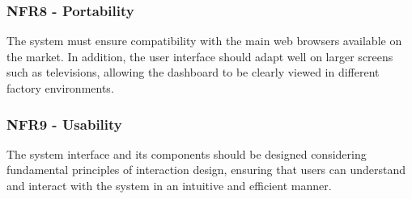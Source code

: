 \subsubsection{NFR8 - Portability}
The system must ensure compatibility with the main web browsers available on the market. In addition, the user interface should adapt well on larger screens such as televisions, allowing the dashboard to be clearly viewed in different factory environments.

\subsubsection{NFR9 - Usability}The system interface and its components should be designed considering fundamental principles of interaction design, ensuring that users can understand and interact with the system in an intuitive and efficient manner.









